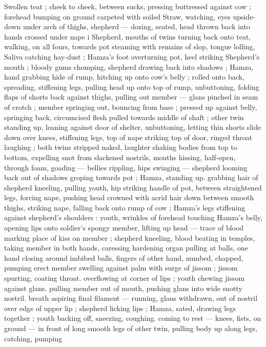 Swollen teat ; cheek to cheek, between sucks, pressing buttressed
against cow ; forehead bumping on ground carpeted with soiled
Straw, watching, eyes upside-down under arch of thighs, shepherd
--- dozing, seated, head thrown back into hands crossed under nape
i Shepherd, mouths of twins turning back onto teat, walking, on all
fours, towards pot steaming with remains of slop, tongue lolling,
Saliva catching hay-dust ; Hamza's foot overturning pot, heel striking
Shepherd's mouth ; bloody gums chomping, shepherd drawing back
into shadows ; Hamza, hand grabbing hide of rump, hitching up onto
cow's belly ; rolled onto back, spreading, stiffening legs, pulling
head up onto top of rump, unbuttoning, folding flaps of shorts back
against thighs, pulling out member --- glans pinched in seam of
crotch ; member springing out, bouncing from base ; pressed up
against belly, springing back, circumcised flesh pulled towards
middle of shaft ; other twin standing up, leaning against door of
shelter, unbuttoning, letting thin shorts slide down over knees,
stiffening legs, top of nape striking top of door, ringed throat
laughing ; both twins stripped naked, laughter shaking bodies from
top to bottom, expelling snot from slackened nostrils, mouths
hissing, half-open, through foam, goading --- bellies rippling, hips
swinging --- shepherd looming back out of shadows groping towards
pot ; Hamza, standing up. grabbing hair of shepherd kneeling,
pulling youth, hip striking handle of pot, between straightened legs,
forcing nape, pushing head crowned with acrid hair down between
smooth thighs, striking nape, falling back onto rump of cow ;
Hamza's legs stiffening against shepherd's shoulders : youth,
wrinkles of forehead touching Hamza's belly, opening lips onto
soldier's spongy member, lifting up head --- trace of blood marking
place of kiss on member ; shepherd kneeling, blood beating in
temples, taking member in both hands, caressing hardening organ
pulling at balls, one hand closing around imbibed balls, fingers of
other hand, numbed, chapped, pumping erect member swelling
against palm with surge of jissom ; jissom spurting, coating throat.
overflowing at corner of lips ; youth chewing jissom against glans.
pulling member out of mouth, pushing glans into wide snotty nostril.
breath aspiring final filament --- running, glans withdrawn, out of
nostril over edge of upper lip ; shepherd licking lips ; Hamza, sated,
drawing legs together ; youth backing off, sneezing, coughing.
coming to rest --- knees, fists, on ground --- in front of long smooth
legs of other twin, pulling body up along legs, catching, pumping
